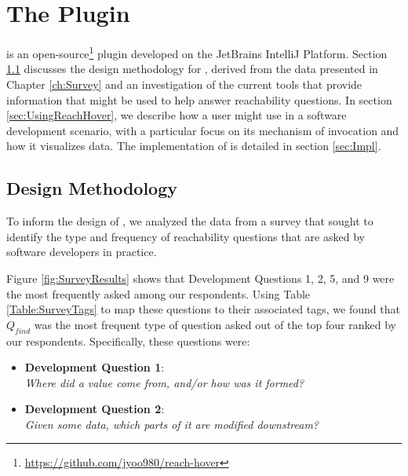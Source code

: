 
\chapter{The \toolname{} Plugin}
\label{ch:Tool}


\noindent \toolname{} is an open-source\footnote{\url{https://github.com/jyoo980/reach-hover}}
plugin developed on the JetBrains IntelliJ Platform.
Section \ref{sec:DesignMeth} discusses the design methodology for \toolname{},
derived from the data presented in Chapter \ref{ch:Survey} and an investigation
of the current tools that provide information that might be used to help answer
reachability questions.
In section \ref{sec:UsingReachHover}, we describe how a user might use
\toolname{} in a software development scenario, with a particular focus on
its mechanism of invocation and how it visualizes data.
The implementation of \toolname{} is detailed in section
\ref{sec:Impl}.

\section{Design Methodology}
\label{sec:DesignMeth}

\noindent To inform the design of \toolname{}, we analyzed the data from a 
survey that sought to identify the type and frequency of reachability questions 
that are asked by software developers in practice.

Figure \ref{fig:SurveyResults} shows that Development Questions 1, 2, 5, and 9
were the most frequently asked among our respondents.
Using Table \ref{Table:SurveyTags} to map these questions to their associated
tags, we found that $Q_{find}$ was the most frequent type of question asked out
of the top four ranked by our respondents.
Specifically, these questions were:

\begin{itemize}
  \item[] \textbf{Development Question 1}:\\ \textit{Where did a value come from,
  and/or how was it formed?}
  \item[] \textbf{Development Question 2}:\\ \textit{Given some data, which
  parts of it are modified downstream?}
\end{itemize}

